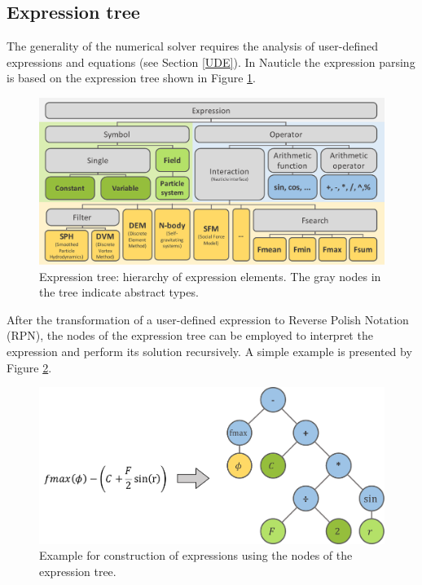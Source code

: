 \documentclass[a4paper,12pt,openany]{book}
\theoremstyle{break}
\begin{document}
\subsection{Expression tree}
The generality of the numerical solver requires the analysis of user-defined expressions and equations (see Section \ref{UDE}). In Nauticle the expression parsing is based on the expression tree shown in Figure \ref{fig:expression_tree}.
\begin{figure}[H]
  \includegraphics[scale=0.5]{expression_tree.pdf}
  \centering
  \caption{Expression tree: hierarchy of expression elements. The gray nodes in the tree indicate abstract types.}
  \label{fig:expression_tree}
\end{figure}\vspace*{3pt}

After the transformation of a user-defined expression to Reverse Polish Notation (RPN), the nodes of the expression tree can be employed to interpret the expression and perform its solution recursively. A simple example is presented by Figure \ref{fig:expression_example}.
\begin{figure}[H]
  \includegraphics[scale=0.5]{expression_example.pdf}
  \centering
  \caption{Example for construction of expressions using the nodes of the expression tree.}
  \label{fig:expression_example}
\end{figure}\vspace*{3pt}
\end{document}
